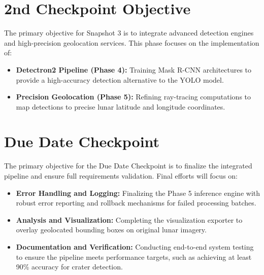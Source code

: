 \documentclass[11pt]{article}
\begin{document}
\section*{2nd Checkpoint Objective}
The primary objective for Snapshot 3 is to integrate advanced detection engines and high-precision geolocation services. This phase focuses on the implementation of:
\begin{itemize}
    \item \textbf{Detectron2 Pipeline (Phase 4):} Training Mask R-CNN architectures to provide a high-accuracy detection alternative to the YOLO model.
    \item \textbf{Precision Geolocation (Phase 5):} Refining ray-tracing computations to map detections to precise lunar latitude and longitude coordinates.
\end{itemize}

\section*{Due Date Checkpoint}
The primary objective for the Due Date Checkpoint is to finalize the integrated pipeline and ensure full requirements validation. Final efforts will focus on:
\begin{itemize}
    \item \textbf{Error Handling and Logging:} Finalizing the Phase 5 inference engine with robust error reporting and rollback mechanisms for failed processing batches.
    \item \textbf{Analysis and Visualization:} Completing the visualization exporter to overlay geolocated bounding boxes on original lunar imagery.
    \item \textbf{Documentation and Verification:} Conducting end-to-end system testing to ensure the pipeline meets performance targets, such as achieving at least 90\% accuracy for crater detection.
\end{itemize}
\end{document}
